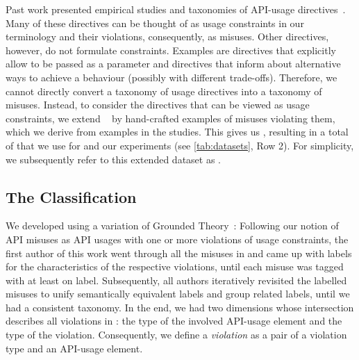 Past work presented empirical studies and taxonomies of API-usage directives~\cite{DH09,METM12}.
Many of these directives can be thought of as usage constraints in our terminology and their violations, consequently, as misuses.
Other directives, however, do not formulate constraints.
Examples are directives that explicitly allow  to be passed as a parameter and directives that inform about alternative ways to achieve a behaviour (possibly with different trade-offs).
Therefore, we cannot directly convert a taxonomy of usage directives into a taxonomy of misuses.
Instead, to consider the directives that can be viewed as usage constraints, we extend \MUBench~\cite{ANNN+16} by hand-crafted examples of misuses violating them, which we derive from examples in the studies.
This gives us , resulting in a total of  that we use for \MUC and our experiments (see \autoref{tab:datasets}, Row 2).
For simplicity, we subsequently refer to this extended dataset as \MUBench.




\subsection{The Classification}

We developed \MUC using a variation of Grounded Theory~\cite{GS67}:
Following our notion of API misuses as API usages with one or more violations of usage constraints, the first author of this work went through all the misuses in \MUBench and came up with labels for the characteristics of the respective violations, until each misuse was tagged with at least on label.
Subsequently, all authors iteratively revisited the labelled misuses to unify semantically equivalent labels and group related labels, until we had a consistent taxonomy.
In the end, we had two dimensions whose intersection describes all violations in \MUBench:
the type of the involved API-usage element and the type of the violation.
Consequently, we define a \emph{violation} as a pair of a violation type and an API-usage element.

